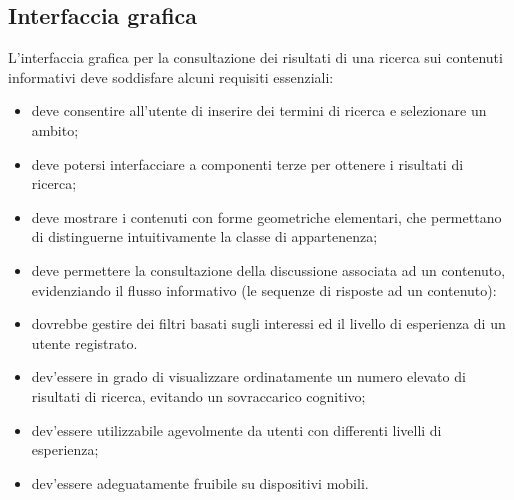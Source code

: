 \subsection{Interfaccia grafica}
\label{sec:tesi:progetto:requisiti:interfaccia-grafica}
L'interfaccia grafica per la consultazione dei risultati di una ricerca sui contenuti informativi deve soddisfare alcuni requisiti essenziali:

\begin{itemize}
	\item deve consentire all'utente di inserire dei termini di ricerca e selezionare un ambito;
	\item deve potersi interfacciare a componenti terze per ottenere i risultati di ricerca;
	\item deve mostrare i contenuti con forme geometriche elementari, che permettano di distinguerne intuitivamente la classe di appartenenza;
	\item deve permettere la consultazione della discussione associata ad un contenuto, evidenziando il flusso informativo (le sequenze di risposte ad un contenuto):
	\item dovrebbe gestire dei filtri basati sugli interessi ed il livello di esperienza di un utente registrato.
	\item dev'essere in grado di visualizzare ordinatamente un numero elevato di risultati di ricerca, evitando un sovraccarico cognitivo;
	\item dev'essere utilizzabile agevolmente da utenti con differenti livelli di esperienza;
	\item dev'essere adeguatamente fruibile su dispositivi mobili.
\end{itemize}
